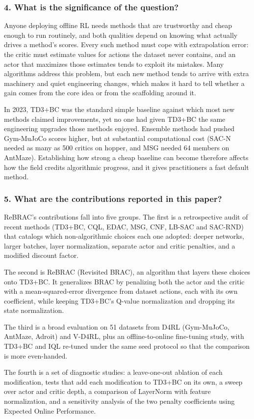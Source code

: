 \documentclass[11pt]{article}
\newcommand{\question}[1]{\subsubsection*{#1}}
\begin{document}
\question{4. What is the significance of the question?}

Anyone deploying offline RL needs methods that are trustworthy and cheap enough to run routinely, and both qualities depend on knowing what actually drives a method's scores. Every such method must cope with extrapolation error: the critic must estimate values for actions the dataset never contains, and an actor that maximizes those estimates tends to exploit its mistakes. Many algorithms address this problem, but each new method tends to arrive with extra machinery and quiet engineering changes, which makes it hard to tell whether a gain comes from the core idea or from the scaffolding around it.

In 2023, TD3+BC was the standard simple baseline against which most new methods claimed improvements, yet no one had given TD3+BC the same engineering upgrades those methods enjoyed. Ensemble methods had pushed Gym-MuJoCo scores higher, but at substantial computational cost (SAC-N needed as many as 500 critics on hopper, and MSG needed 64 members on AntMaze). Establishing how strong a cheap baseline can become therefore affects how the field credits algorithmic progress, and it gives practitioners a fast default method.

\question{5. What are the contributions reported in this paper?}

ReBRAC's contributions fall into five groups. The first is a retrospective audit of recent methods (TD3+BC, CQL, EDAC, MSG, CNF, LB-SAC and SAC-RND) that catalogs which non-algorithmic choices each one adopted: deeper networks, larger batches, layer normalization, separate actor and critic penalties, and a modified discount factor.

The second is ReBRAC (Revisited BRAC), an algorithm that layers these choices onto TD3+BC. It generalizes BRAC by penalizing both the actor and the critic with a mean-squared-error divergence from dataset actions, each with its own coefficient, while keeping TD3+BC's Q-value normalization and dropping its state normalization.

The third is a broad evaluation on 51 datasets from D4RL (Gym-MuJoCo, AntMaze, Adroit) and V-D4RL, plus an offline-to-online fine-tuning study, with TD3+BC and IQL re-tuned under the same seed protocol so that the comparison is more even-handed.

The fourth is a set of diagnostic studies: a leave-one-out ablation of each modification, tests that add each modification to TD3+BC on its own, a sweep over actor and critic depth, a comparison of LayerNorm with feature normalization, and a sensitivity analysis of the two penalty coefficients using Expected Online Performance.
\end{document}

